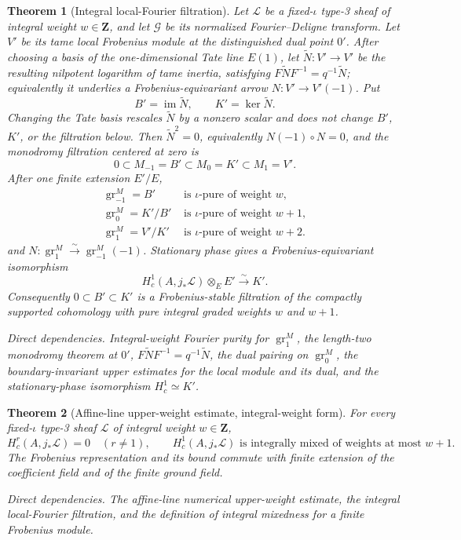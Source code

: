 \documentclass[10pt]{article}
\newtheorem{theorem}{Theorem}[section]
\theoremstyle{definition}
\newcommand{\dep}[1]{\par\smallskip\noindent\textit{Direct dependencies.} #1\par}
\begin{document}
\begin{theorem}[Integral local-Fourier filtration]
Let \(\mathcal L\) be a fixed-\(\iota\) type-3 sheaf of integral weight
\(w\in\mathbf Z\), and let \(\mathcal G\) be its normalized
Fourier--Deligne transform.  Let \(V'\) be its tame local Frobenius module
at the distinguished dual point \(0'\).  After choosing a basis of the
one-dimensional Tate line \(E(1)\), let
\(\widetilde N:V'\to V'\) be the resulting nilpotent logarithm of tame
inertia, satisfying \(F\widetilde NF^{-1}=q^{-1}\widetilde N\); equivalently
it underlies a Frobenius-equivariant arrow \(N:V'\to V'(-1)\).  Put
\[
                  B'=\operatorname{im}\widetilde N,
        \qquad    K'=\ker\widetilde N.
\]
Changing the Tate basis rescales \(\widetilde N\) by a nonzero scalar and
does not change \(B'\), \(K'\), or the filtration below.
Then \(\widetilde N^2=0\), equivalently \(N(-1)\circ N=0\), and the
monodromy filtration centered at zero is
\[
 0\subset M_{-1}=B'\subset M_0=K'\subset M_1=V'.
\]
 After one finite extension \(E'/E\),
\begin{align*}
 \operatorname{gr}_{-1}^M=B'&\text{ is \(\iota\)-pure of weight }w,\\
 \operatorname{gr}_{0}^M=K'/B'&\text{ is \(\iota\)-pure of weight }w+1,\\
 \operatorname{gr}_{1}^M=V'/K'&\text{ is \(\iota\)-pure of weight }w+2.
\end{align*}
and \(N:\operatorname{gr}_1^M\xrightarrow{\sim}
\operatorname{gr}_{-1}^M(-1)\).  Stationary phase gives a
Frobenius-equivariant isomorphism
\[
 H_c^1(A,j_*\mathcal L)\otimes_EE'\xrightarrow{\sim}K'.
\]
Consequently \(0\subset B'\subset K'\) is a Frobenius-stable filtration
of the compactly supported cohomology with pure integral graded weights
\(w\) and \(w+1\).
\dep{Integral-weight Fourier purity for \(\operatorname{gr}_1^M\), the
length-two monodromy theorem at \(0'\),
\(F\widetilde NF^{-1}=q^{-1}\widetilde N\), the dual
pairing on \(\operatorname{gr}_0^M\), the boundary-invariant upper
estimates for the local module and its dual, and the stationary-phase
isomorphism \(H_c^1\simeq K'\).}
\end{theorem}

\begin{theorem}[Affine-line upper-weight estimate, integral-weight form]
For every fixed-\(\iota\) type-3 sheaf \(\mathcal L\) of integral weight
\(w\in\mathbf Z\),
\[
 H_c^r(A,j_*\mathcal L)=0\quad(r\ne1),
 \qquad
 H_c^1(A,j_*\mathcal L)
       \text{ is integrally mixed of weights at most }w+1.
\]
The Frobenius representation and its bound commute with finite extension of
the coefficient field and of the finite ground field.
\dep{The affine-line numerical upper-weight estimate, the integral
local-Fourier filtration, and the definition of integral mixedness for a
finite Frobenius module.}
\end{theorem}
\end{document}
